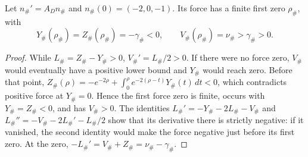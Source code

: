 \begin{lemma}\label{con:normal-opening}
Let $n_\#'=A_Dn_\#$ and $n_\#(0)=(-2,0,-1)$.  Its force has a finite
first zero $\rho_\#$, with
\begin{equation}
 Y_\#(\rho_\#)=Z_\#(\rho_\#)=-\gamma_\#<0,\qquad
 V_\#(\rho_\#)=\nu_\#>\gamma_\#>0.
 \label{con:canonical-release}
\end{equation}
\end{lemma}
\begin{proof}
While $L_\#=Z_\#-Y_\#>0$, $V_\#'=L_\#/2>0$.  If there were no
force zero, $V_\#$ would eventually have a positive lower bound and
$Y_\#$ would reach zero.  Before that point,
$Z_\#(\rho)=-e^{-2\rho}+\int_0^\rho e^{-2(\rho-t)}Y_\#(t)\,dt<0$,
which contradicts positive force at $Y_\#=0$.  Hence the first force
zero is finite, occurs with $Y_\#=Z_\#<0$, and has $V_\#>0$.
The identities
$L_\#'=-Y_\#-2L_\#-V_\#$ and
$L_\#''=-V_\#-2L_\#'-L_\#/2$ show that its derivative there is
strictly negative: if it vanished, the second identity would make
the force negative just before its first zero.  At the zero,
$-L_\#'=V_\#+Z_\#=\nu_\#-\gamma_\#$.
\end{proof}


